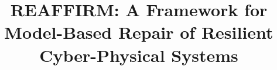\documentclass[sigconf]{acmart}
\begin{document}






%
\title{REAFFIRM: A Framework for Model-Based Repair of Resilient Cyber-Physical Systems}


\end{document}
